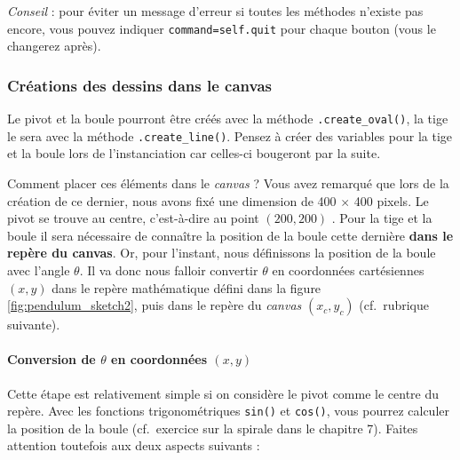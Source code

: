\documentclass[a4paper,11pt,twoside]{book}
\let\oldparagraph\paragraph
\renewcommand{\paragraph}[1]{\oldparagraph{#1}\mbox{}}
\begin{document}
\emph{Conseil} : pour éviter un message d'erreur si toutes les méthodes
n'existe pas encore, vous pouvez indiquer \texttt{command=self.quit}
pour chaque bouton (vous le changerez après).

\subsubsection{Créations des dessins dans le
canvas}\label{cruxe9ations-des-dessins-dans-le-canvas}

Le pivot et la boule pourront être créés avec la méthode
\texttt{.create\_oval()}, la tige le sera avec la méthode
\texttt{.create\_line()}. Pensez à créer des variables pour la tige et
la boule lors de l'instanciation car celles-ci bougeront par la suite.

Comment placer ces éléments dans le \emph{canvas} ? Vous avez remarqué
que lors de la création de ce dernier, nous avons fixé une dimension de
400 \(\times\) 400 pixels. Le pivot se trouve au centre, c'est-à-dire au
point \((200, 200)\) . Pour la tige et la boule il sera nécessaire de
connaître la position de la boule cette dernière \textbf{dans le repère
du canvas}. Or, pour l'instant, nous définissons la position de la boule
avec l'angle \(\theta\). Il va donc nous falloir convertir \(\theta\) en
coordonnées cartésiennes \((x, y)\) dans le repère mathématique défini
dans la figure \ref{fig:pendulum_sketch2}, puis dans le repère du
\emph{canvas} \((x_{c}, y_{c})\) (cf.~rubrique suivante).

\paragraph{\texorpdfstring{Conversion de \(\theta\) en coordonnées
\((x, y)\)}{Conversion de \textbackslash{}theta en coordonnées (x, y)}}\label{conversion-de-theta-en-coordonnuxe9es-x-y}

Cette étape est relativement simple si on considère le pivot comme le
centre du repère. Avec les fonctions trigonométriques \texttt{sin()} et
\texttt{cos()}, vous pourrez calculer la position de la boule
(cf.~exercice sur la spirale dans le chapitre 7). Faites attention
toutefois aux deux aspects suivants :
\end{document}
